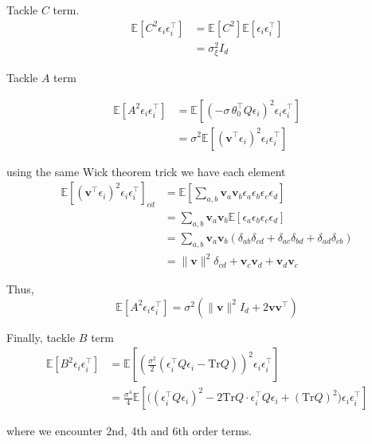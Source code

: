     Tackle $C$ term. 
    \begin{align*}
    \mathbb{E}[C^{2}\epsilon_{i}\epsilon_{i}^{\top}] & =\mathbb{E}[C^{2}]\mathbb{E}[\epsilon_{i}\epsilon_{i}^{\top}]\\
     & =\sigma_{\xi}^{2}I_{d}
    \end{align*}
    
    Tackle \textbf{$A$} term
    
    \begin{align*}
    \mathbb{E}[A^{2}\epsilon_{i}\epsilon_{i}^{\top}] & =\mathbb{E}[(-\sigma\,\theta_{0}^{\top}Q\epsilon_{i})^{2}\epsilon_{i}\epsilon_{i}^{\top}]\\
     & =\sigma^{2}\mathbb{E}[(\mathbf{v}^{\top}\epsilon_{i})^{2}\epsilon_{i}\epsilon_{i}^{\top}]
    \end{align*}
    
    using the same Wick theorem trick we have each element 
    \begin{align*}
    \mathbb{E}[(\mathbf{v}^{\top}\epsilon_{i})^{2}\epsilon_{i}\epsilon_{i}^{\top}]_{cd} & =\mathbb{E}[\sum_{a,b}\mathbf{v}_{a}\mathbf{v}_{b}\epsilon_{a}\epsilon_{b}\epsilon_{c}\epsilon_{d}]\\
     & =\sum_{a,b}\mathbf{v}_{a}\mathbf{v}_{b}\mathbb{E}[\epsilon_{a}\epsilon_{b}\epsilon_{c}\epsilon_{d}]\\
     & =\sum_{a,b}\mathbf{v}_{a}\mathbf{v}_{b}(\delta_{ab}\delta_{cd}+\delta_{ac}\delta_{bd}+\delta_{ad}\delta_{cb})\\
     & =\|\mathbf{v}\|^{2}\delta_{cd}+\mathbf{v}_{c}\mathbf{v}_{d}+\mathbf{v}_{d}\mathbf{v}_{c}
    \end{align*}
    
    Thus, 
    \[
    \mathbb{E}[A^{2}\epsilon_{i}\epsilon_{i}^{\top}]=\sigma^{2}(\|\mathbf{v}\|^{2}I_{d}+2\mathbf{v}\mathbf{v}^{\top})
    \]
    
    Finally, tackle $B$ term 
    \begin{align*}
    \mathbb{E}[B^{2}\epsilon_{i}\epsilon_{i}^{\top}] & =\mathbb{E}[(\frac{\sigma^{2}}{2}(\epsilon_{i}^{\top}Q\epsilon_{i}-\mathrm{Tr}Q))^{2}\epsilon_{i}\epsilon_{i}^{\top}]\\
     & =\frac{\sigma^{4}}{4}\mathbb{E}[\Big((\epsilon_{i}^{\top}Q\epsilon_{i})^{2}-2\mathrm{Tr}Q\cdot\epsilon_{i}^{\top}Q\epsilon_{i}+(\mathrm{Tr}Q)^{2}\Big)\epsilon_{i}\epsilon_{i}^{\top}]
    \end{align*}
    
    where we encounter 2nd, 4th and 6th order terms. 
    
